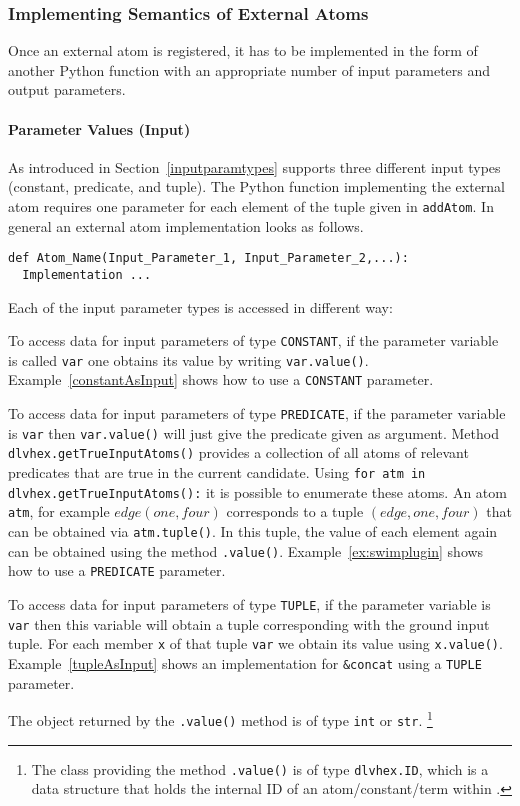 \documentclass[a4paper, titlepage]{article}
\newcommand{\mi}[1]{\mathit{#1}}
\begin{document}
\subsubsection{Implementing Semantics of External Atoms}
Once an external atom is registered,
it has to be implemented in the form of another Python function 
with an appropriate number of input parameters and output parameters.
\paragraph{Parameter Values (Input)}
As introduced in Section~\ref{inputparamtypes}
\dlvhex{} supports three different input types
(constant, predicate, and tuple).
The Python function implementing the external atom
requires one parameter for each element of the tuple given in \verb|addAtom|.
In general an external atom implementation looks as follows.
\begin{lstlisting}
def Atom_Name(Input_Parameter_1, Input_Parameter_2,...):
  Implementation ...
\end{lstlisting}
Each of the input parameter types is accessed in different way: 
\begin{compactitem}
\item
  To access data for input parameters of type \verb+CONSTANT+,
  if the parameter variable is called \verb+var+
  one obtains its value by writing \verb+var.value()+.
  Example~\ref{constantAsInput} shows how to use a \verb+CONSTANT+ parameter.
\item
  To access data for input parameters of type \verb+PREDICATE+,
  if the parameter variable is \verb+var+
  then \verb+var.value()+ will just give the predicate given as argument.
  Method \verb+dlvhex.getTrueInputAtoms()+ provides a collection
  of all atoms of relevant predicates that are true in the current candidate.
  Using \verb+for atm in dlvhex.getTrueInputAtoms():+
  it is possible to enumerate these atoms.
  An atom \verb+atm+, for example $\mi{edge}(\mi{one},\mi{four})$
  corresponds to a tuple $(\mi{edge},\mi{one},\mi{four})$
  that can be obtained via \verb+atm.tuple()+.
  In this tuple, the value of each element again can be obtained
  using the method \verb+.value()+.
  Example~\ref{ex:swimplugin} shows how to use a \verb+PREDICATE+ parameter.
\item
  To access data for input parameters of type \verb+TUPLE+,
  if the parameter variable is \verb+var+ then
  this variable will obtain a tuple corresponding with the ground input tuple.
  For each member \verb+x+ of that tuple \verb+var+
  we obtain its value using \verb+x.value()+.
  Example~\ref{tupleAsInput} shows an implementation for \verb|&concat|
  using a \verb+TUPLE+ parameter.
\end{compactitem}
%
The object returned by the \verb+.value()+ method
is of type \verb|int| or \verb|str|.%
\footnote{The class providing the method \texttt{.value()}
  is of type \texttt{dlvhex.ID}, which is a data structure
  that holds the internal ID of an atom/constant/term within \dlvhex.}
\end{document}
